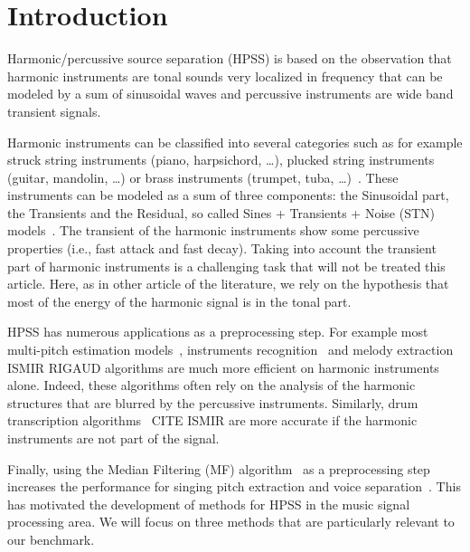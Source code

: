 \section{Introduction}
\label{sec:intro}


Harmonic/percussive source separation (HPSS) is based on the observation that harmonic instruments are tonal sounds very localized in frequency that can be modeled by a sum of sinusoidal waves and percussive instruments are wide band transient signals.

Harmonic instruments can be classified into several categories such as for example struck string instruments (piano, harpsichord, \ldots), plucked string instruments (guitar, mandolin, \ldots) or brass instruments (trumpet, tuba, \ldots)~\cite{peeters2003automatic}. These instruments can be modeled as a sum of three components: the Sinusoidal part, the Transients and the Residual, so called  Sines + Transients + Noise (STN) models~\cite{daudet2006review}. The transient of the harmonic instruments show some percussive properties (i.e., fast attack and fast decay). Taking into account the transient part of harmonic instruments is a challenging task that will not be treated this article. Here, as in other article of the literature, we rely on the hypothesis that most of the energy of the harmonic signal is in the tonal part. 


HPSS has numerous applications as a preprocessing step. For example most multi-pitch estimation models~\cite{klapuri2008multipitch}, instruments recognition~\cite{eronen2000musical} and melody extraction~\cite{salamon2012melody} ISMIR RIGAUD algorithms are much more efficient on harmonic instruments alone. Indeed, these algorithms often rely on the analysis of the harmonic structures that are blurred by the percussive instruments. Similarly, drum transcription algorithms~\cite{paulus2005drum} CITE ISMIR are more accurate if the harmonic instruments are not part of the signal. 



Finally, using the Median Filtering (MF) algorithm~\cite{fitzgerald2010harmonic} as a preprocessing step increases the performance for singing pitch extraction and voice separation~\cite{hsu2012tandem}. This has motivated the development of methods for HPSS in the music signal processing area. We will focus on three methods that are particularly relevant to our benchmark. 


